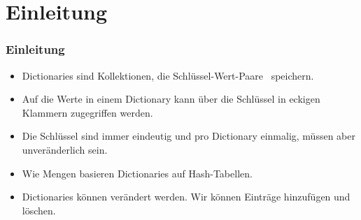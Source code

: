 \documentclass[aspectratio=169,mathserif,notheorems]{beamer}%
\subtitle{21.~Dictionaries bzw.\ Hash Maps}%
\begin{document}
%
%
\startPresentation%
%
\section{Einleitung}%
\begin{frame}[t]%
\frametitle{Einleitung}%
%
\begin{itemize}%
\item Dictionaries sind Kollektionen, die Schlüssel-Wert-Paare~ speichern.%
%
\item<2-> Auf die Werte in einem Dictionary kann über die Schlüssel in eckigen Klammern zugegriffen werden.%
%
\item<3-> Die Schlüssel sind immer eindeutig und pro Dictionary einmalig, müssen aber unveränderlich sein.%
%
\item<5-> Wie Mengen basieren Dictionaries auf Hash-Tabellen.
%
\item<6-> Dictionaries können verändert werden. Wir können Einträge hinzufügen und löschen.%
\end{itemize}%
%
%
%
\end{frame}%
%
%
\end{document}

